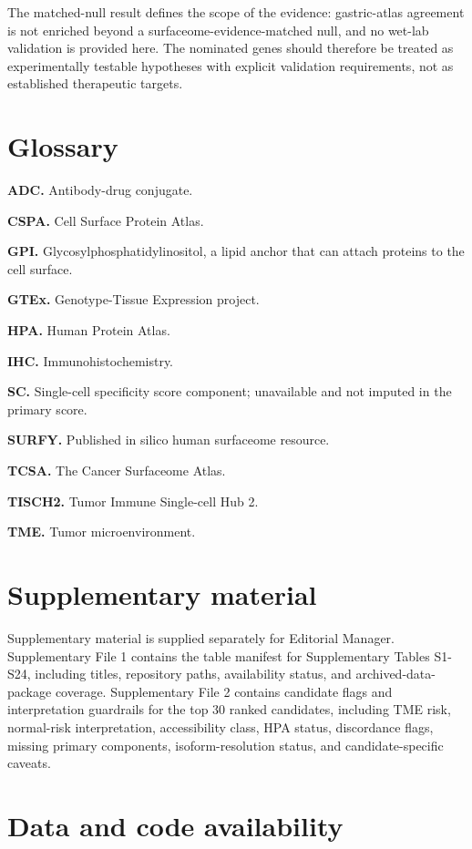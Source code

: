 \documentclass[preprint,12pt,authoryear]{elsarticle}
\begin{document}
The matched-null result defines the scope of the evidence: gastric-atlas agreement is not enriched beyond a surfaceome-evidence-matched null, and no wet-lab validation is provided here. The nominated genes should therefore be treated as experimentally testable hypotheses with explicit validation requirements, not as established therapeutic targets.

\FloatBarrier
\section{Glossary}

\textbf{ADC.} Antibody-drug conjugate.

\textbf{CSPA.} Cell Surface Protein Atlas.

\textbf{GPI.} Glycosylphosphatidylinositol, a lipid anchor that can attach proteins to the cell surface.

\textbf{GTEx.} Genotype-Tissue Expression project.

\textbf{HPA.} Human Protein Atlas.

\textbf{IHC.} Immunohistochemistry.

\textbf{SC.} Single-cell specificity score component;\allowbreak{} unavailable and not imputed in the primary score.

\textbf{SURFY.} Published in silico human surfaceome resource.

\textbf{TCSA.} The Cancer Surfaceome Atlas.

\textbf{TISCH2.} Tumor Immune Single-cell Hub 2.

\textbf{TME.} Tumor microenvironment.

\FloatBarrier
\section{Supplementary material}

Supplementary material is supplied separately for Editorial Manager. Supplementary File 1 contains the table manifest for Supplementary Tables S1-S24, including titles, repository paths, availability status, and archived-data-package coverage. Supplementary File 2 contains candidate flags and interpretation guardrails for the top 30 ranked candidates, including TME risk, normal-risk interpretation, accessibility class, HPA status, discordance flags, missing primary components, isoform-resolution status, and candidate-specific caveats.

\FloatBarrier
\section{Data and code availability}
\end{document}
